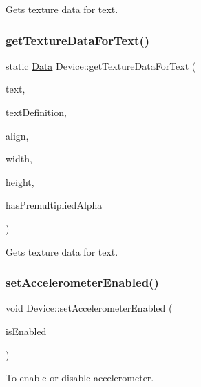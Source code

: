 Gets texture data for text. \mbox{\label{classDevice_ad52511a8322890c713f87457bfef4840}} 
\subsubsection{\texorpdfstring{get\+Texture\+Data\+For\+Text()}{getTextureDataForText()}\hspace{0.1cm}{\footnotesize\ttfamily [2/2]}}
{\footnotesize\ttfamily static \hyperlink{classData}{Data} Device\+::get\+Texture\+Data\+For\+Text (\begin{DoxyParamCaption}\item[{const char $\ast$}]{text,  }\item[{const \hyperlink{structFontDefinition}{Font\+Definition} \&}]{text\+Definition,  }\item[{\hyperlink{classDevice_a62f8577d4803c8fce764f7cdff2abe92}{Text\+Align}}]{align,  }\item[{int \&}]{width,  }\item[{int \&}]{height,  }\item[{bool \&}]{has\+Premultiplied\+Alpha }\end{DoxyParamCaption})\hspace{0.3cm}{\ttfamily [static]}}

Gets texture data for text. \mbox{\label{classDevice_ac988691d36ced3bafec35d0f8f41ebb3}} 
\subsubsection{\texorpdfstring{set\+Accelerometer\+Enabled()}{setAccelerometerEnabled()}\hspace{0.1cm}{\footnotesize\ttfamily [1/2]}}
{\footnotesize\ttfamily void Device\+::set\+Accelerometer\+Enabled (\begin{DoxyParamCaption}\item[{bool}]{is\+Enabled }\end{DoxyParamCaption})\hspace{0.3cm}{\ttfamily [static]}}

To enable or disable accelerometer. \mbox{\label{classDevice_a0a2adf1ca94fcc83246fbc675c15874f}} 

